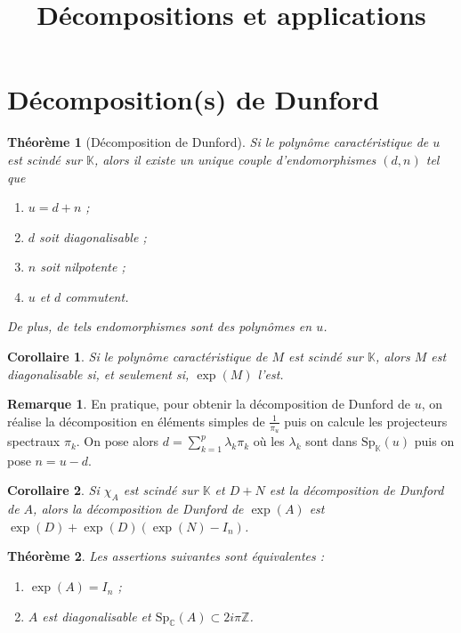 \documentclass[french]{article}
\title{Décompositions et applications}
\newcommand{\Z}{\mathbb{Z}}
\newcommand{\C}{\mathbb{C}}
\newcommand{\K}{\mathbb{K}}
\theoremstyle{plain}
\newtheorem{thm}{Théorème}
\newtheorem{cor}{Corollaire}
\theoremstyle{definition}
\newtheorem{rmq}{Remarque}
\begin{document}
\maketitle
\section{Décomposition(s) de Dunford}
\begin{thm}[Décomposition de Dunford]
	Si le polynôme caractéristique de $u$ est scindé sur $\K$, alors il existe un unique couple d'endomorphismes $(d,n)$ tel que
	\begin{enumerate}
		\item $u=d+n$ ;
		\item $d$ soit diagonalisable ;
		\item $n$ soit nilpotente ;
		\item $u$ et $d$ commutent.
	\end{enumerate}
	De plus, de tels endomorphismes sont des polynômes en $u$.
\end{thm}

\begin{cor}
	Si le polynôme caractéristique de $M$ est scindé sur $\K$, alors $M$ est diagonalisable si, et seulement si, $\exp(M)$ l'est.
\end{cor}

\begin{rmq}
	En pratique, pour obtenir la décomposition de Dunford de $u$, on réalise la décomposition en éléments simples de $\displaystyle\frac{1}{\pi_u}$ puis on calcule les projecteurs spectraux $\pi_k$. On pose alors $d=\displaystyle\sum_{k=1}^{p}\lambda_k\pi_k$ où les $\lambda_k$ sont dans $\text{Sp}_\K(u)$ puis on pose $n=u-d$.
\end{rmq}

\begin{cor}
	Si $\chi_A$ est scindé sur $\K$ et $D+N$ est la décomposition de Dunford de $A$, alors la décomposition de Dunford de $\exp(A)$ est $\exp(D)+\exp(D)(\exp(N)-I_n)$.
\end{cor}

\begin{thm}
	Les assertions suivantes sont équivalentes :
	\begin{enumerate}[label=\roman*)]
		\item $\exp(A)=I_n$ ;
		\item $A$ est diagonalisable et $\text{Sp}_\C(A)\subset 2i\pi\Z$.
	\end{enumerate}
\end{thm}
\end{document}
